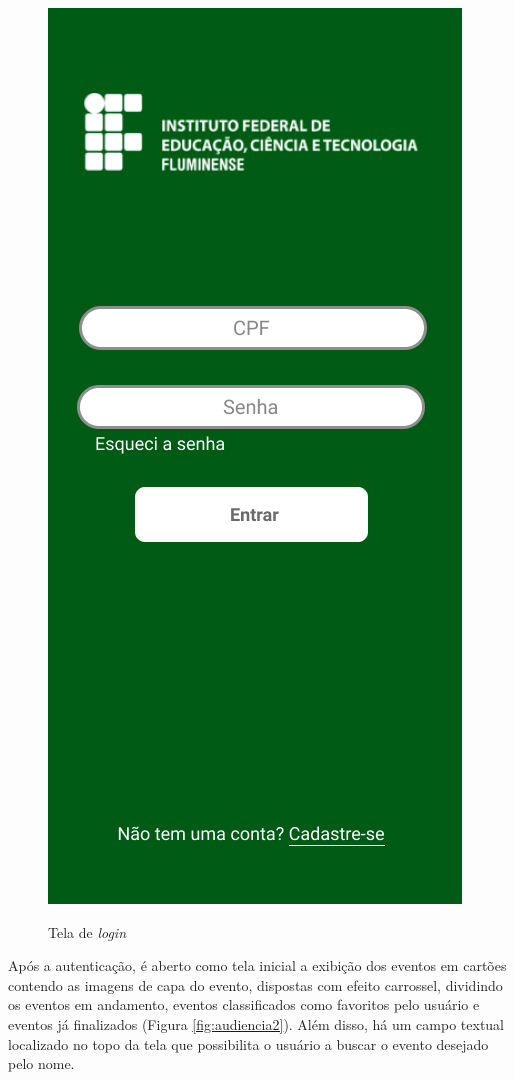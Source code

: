 \begin{figure}[H]
    \centering
    \caption{Tela de \textit{login}}
    \includegraphics[scale=0.44]{figuras/Audiencia/1-Login.jpg}
    \label{fig:audiencia1}
\end{figure}

Após a autenticação, é aberto como tela inicial a exibição dos eventos em cartões contendo as imagens de capa do evento, dispostas com efeito carrossel, dividindo os eventos em andamento, eventos classificados como favoritos pelo usuário e eventos já finalizados (Figura \ref{fig:audiencia2}). Além disso, há um campo textual localizado no topo da tela que possibilita o usuário a buscar o evento desejado pelo nome.

